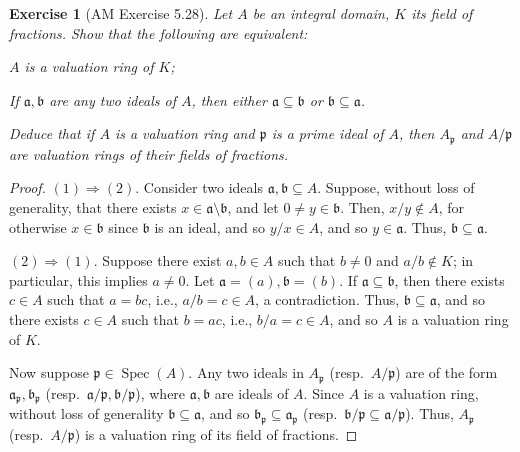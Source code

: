 \documentclass[12pt,letterpaper]{article}
\newtheorem{problem}{Exercise}[section]
\theoremstyle{definition}
\theoremstyle{remark}
\numberwithin{figure}{problem}
\numberwithin{equation}{section}
\DeclareMathOperator{\Spec}{Spec}
\begin{document}
\begin{problem}[AM Exercise 5.28]
  Let $A$ be an integral domain, $K$ its field of fractions. Show that the following are equivalent:
  \begin{enum}
    \item $A$ is a valuation ring of $K$;
    \item If $\mathfrak{a},\mathfrak{b}$ are any two ideals of $A$, then either $\mathfrak{a} \subseteq \mathfrak{b}$ or $\mathfrak{b} \subseteq \mathfrak{a}$.
  \end{enum}
  Deduce that if $A$ is a valuation ring and $\mathfrak{p}$ is a prime ideal of $A$, then $A_{\mathfrak{p}}$ and $A/\mathfrak{p}$ are valuation rings of their fields of fractions.
\end{problem}
\begin{proof}
  $(1) \Rightarrow (2)$. Consider two ideals $\mathfrak{a},\mathfrak{b} \subseteq A$. Suppose, without loss of generality, that there exists $x \in \mathfrak{a} \setminus \mathfrak{b}$, and let $0 \ne y \in \mathfrak{b}$. Then, $x/y \notin A$, for otherwise $x \in \mathfrak{b}$ since $\mathfrak{b}$ is an ideal, and so $y/x \in A$, and so $y \in \mathfrak{a}$. Thus, $\mathfrak{b} \subseteq \mathfrak{a}$.
  \par $(2) \Rightarrow (1)$. Suppose there exist $a,b \in A$ such that $b \ne 0$ and $a/b \notin K$; in particular, this implies $a \ne 0$. Let $\mathfrak{a} = (a),\mathfrak{b} = (b)$. If $\mathfrak{a} \subseteq \mathfrak{b}$, then there exists $c \in A$ such that $a = bc$, i.e., $a/b = c \in A$, a contradiction. Thus, $\mathfrak{b} \subseteq \mathfrak{a}$, and so there exists $c \in A$ such that $b = ac$, i.e., $b/a = c \in A$, and so $A$ is a valuation ring of $K$.
  \par Now suppose $\mathfrak{p} \in \Spec(A)$. Any two ideals in $A_{\mathfrak{p}}$ (resp.~$A/\mathfrak{p}$) are of the form $\mathfrak{a}_{\mathfrak{p}},\mathfrak{b}_{\mathfrak{p}}$ (resp.~$\mathfrak{a}/\mathfrak{p},\mathfrak{b}/\mathfrak{p}$), where $\mathfrak{a},\mathfrak{b}$ are ideals of $A$. Since $A$ is a valuation ring, without loss of generality $\mathfrak{b} \subseteq \mathfrak{a}$, and so $\mathfrak{b}_{\mathfrak{p}} \subseteq \mathfrak{a}_{\mathfrak{p}}$ (resp.~$\mathfrak{b}/\mathfrak{p} \subseteq \mathfrak{a}/\mathfrak{p}$). Thus, $A_{\mathfrak{p}}$ (resp.~$A/\mathfrak{p}$) is a valuation ring of its field of fractions.
\end{proof}
\end{document}
